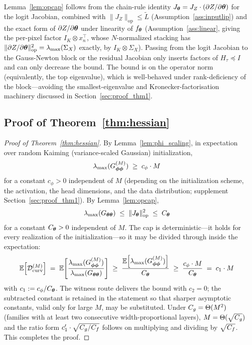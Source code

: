 \begin{remark}
Lemma~\ref{lem:opcap} follows from the chain-rule identity
$J_{\boldsymbol{\theta}} = J_Z \cdot (\partial Z / \partial {\boldsymbol{\theta}})$ for the logit
Jacobian, combined with $\|J_Z\|_{\mathrm{op}} \leq \widetilde{L}$
(Assumption~\ref{ass:inputlip}) and the exact form of $\partial Z /
\partial {\boldsymbol{\theta}}$ under linearity of $f_{\boldsymbol{\theta}}$
(Assumption~\ref{ass:linear}, giving the per-pixel factor $I_K
\otimes x_n^\top$, whose $N$-normalized stacking has
$\|\partial Z / \partial {\boldsymbol{\theta}}\|_{\mathrm{op}}^{2} =
\lambda_{\max}(\Sigma_X)$ exactly, by
$I_K \otimes \Sigma_X$). Passing from the logit Jacobian to the
Gauss-Newton block or the residual Jacobian only inserts factors of
$H_\tau \preceq I$ and can only decrease the bound. The bound is on
the operator norm (equivalently, the top eigenvalue), which is
well-behaved under rank-deficiency of the block---avoiding the
smallest-eigenvalue and Kronecker-factorisation machinery discussed
in Section~\ref{sec:proof_thm1}.
\end{remark}

\subsection{Proof of Theorem~\ref{thm:hessian}}

\begin{proof}[Proof of Theorem~\ref{thm:hessian}]
By Lemma~\ref{lem:phi_scaling}, in expectation over random Kaiming
(variance-scaled Gaussian) initialization,
\[
    \lambda_{\max}(G^{(M)}_{{\boldsymbol{\phi}}{\boldsymbol{\phi}}}) \;\geq\; c_\phi \cdot M
\]
for a constant $c_\phi > 0$ independent of $M$ (depending on the
initialization scheme, the activation, the head dimensions, and the
data distribution; supplement Section~\ref{sec:proof_thm1}). By
Lemma~\ref{lem:opcap},
\[
    \lambda_{\max}(G_{{\boldsymbol{\theta}}{\boldsymbol{\theta}}})
    \;\leq\; \|J_{\boldsymbol{\theta}}\|^2_{\mathrm{op}} \;\leq\; C_{\boldsymbol{\theta}}
\]
for a constant $C_{\boldsymbol{\theta}} > 0$ independent of $M$. The cap is
deterministic---it holds for every realization of the
initialization---so it may be divided through inside the
expectation:
\[
    \mathbb{E}\!\left[\mathcal{D}_{\mathrm{curv}}^{(M)}\right]
    \;=\; \mathbb{E}\!\left[\frac{\lambda_{\max}(G^{(M)}_{{\boldsymbol{\phi}}{\boldsymbol{\phi}}})}
                {\lambda_{\max}(G_{{\boldsymbol{\theta}}{\boldsymbol{\theta}}})}\right]
    \;\geq\; \frac{\mathbb{E}\!\left[\lambda_{\max}(G^{(M)}_{{\boldsymbol{\phi}}{\boldsymbol{\phi}}})\right]}
                  {C_{\boldsymbol{\theta}}}
    \;\geq\; \frac{c_\phi \cdot M}{C_{\boldsymbol{\theta}}}
    \;=\; c_1 \cdot M
\]
with $c_1 := c_\phi / C_{\boldsymbol{\theta}}$. The witness route delivers the
bound with $c_2 = 0$; the subtracted constant is retained in the
statement so that sharper asymptotic constants, valid only for
large $M$, may be substituted. Under
$C_g = \Theta(M^2)$ (families with at least two consecutive
width-proportional layers), $M = \Theta(\sqrt{C_g})$
and the ratio form $c_1' \cdot \sqrt{C_g / C_f}$ follows on multiplying
and dividing by $\sqrt{C_f}$. This completes the proof.
\end{proof}

